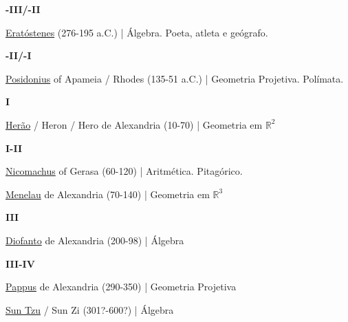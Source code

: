 \documentclass[12pt,a4paper]{article}
\begin{document}
			\textbf{-III/-II}

			\href{http://pt.wikipedia.org/wiki/Erat\%C3\%B3stenes}{Erat\'ostenes} (276-195 a.C.) | \'Algebra. Poeta, atleta e ge\'ografo.

			\begin{flushright}
			\end{flushright}

			\textbf{-II/-I}

			\href{http://en.wikipedia.org/wiki/Posidonius}{Posidonius} of Apameia / Rhodes (135-51 a.C.) | Geometria Projetiva. Pol\'imata.

			\begin{flushright}
			\end{flushright}

			\textbf{I}

			\href{http://pt.wikipedia.org/wiki/Heron_de_Alexandria}{Her\~ao}  / Heron / Hero de Alexandria (10-70) | Geometria em $ \mathbb{R}^2 $

			\begin{flushright}
			\end{flushright}

			\textbf{I-II}

			\href{http://en.wikipedia.org/wiki/Nicomachus}{Nicomachus} of Gerasa (60-120) | Aritm\'etica. Pitag\'orico.

			\href{http://pt.wikipedia.org/wiki/Menelau_de_Alexandria}{Menelau} de Alexandria (70-140) | Geometria em $ \mathbb{R}^3 $

			\begin{flushright}
			\end{flushright}

			\textbf{III}

			\href{http://pt.wikipedia.org/wiki/Diofanto_de_Alexandria}{Diofanto} de Alexandria (200-98) | \'Algebra

			\begin{flushright}
			\end{flushright}

			\textbf{III-IV}

			\href{http://en.wikipedia.org/wiki/Pappus_of_Alexandria}{Pappus} de Alexandria (290-350) | Geometria Projetiva

			\href{http://en.wikipedia.org/wiki/Sun_Tzu_(mathematician)}{Sun Tzu} / Sun Zi (301?-600?) | \'Algebra

			\begin{flushright}
			\end{flushright}
\end{document}
